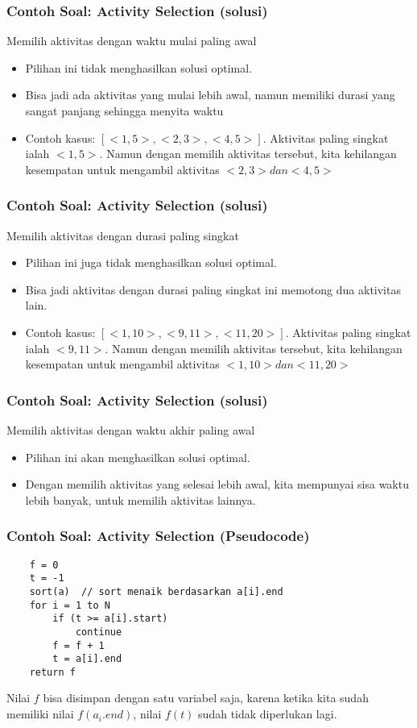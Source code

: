 \begin{frame}
	\frametitle{Contoh Soal: Activity Selection (solusi)}
	Memilih aktivitas dengan waktu mulai paling awal
	\begin{itemize}
		\item Pilihan ini tidak menghasilkan solusi optimal.
		\item Bisa jadi ada aktivitas  yang mulai lebih awal, namun memiliki durasi yang sangat panjang sehingga menyita waktu
		\item Contoh kasus: $[ <1,5>, <2, 3> , <4, 5> ]$. Aktivitas paling singkat ialah $<1, 5>$. Namun dengan memilih aktivitas tersebut, kita kehilangan kesempatan untuk mengambil aktivitas $<2, 3> dan <4, 5> $
	\end{itemize}
\end{frame}

\begin{frame}
	\frametitle{Contoh Soal: Activity Selection (solusi)}
	Memilih aktivitas dengan durasi paling singkat
	\begin{itemize}
		\item Pilihan ini juga tidak menghasilkan solusi optimal.
		\item Bisa jadi aktivitas dengan durasi paling singkat ini memotong dua aktivitas lain.
		\item Contoh kasus: $[ <1,10>, <9, 11> , <11, 20> ]$. Aktivitas paling singkat ialah $<9, 11>$. Namun dengan memilih aktivitas tersebut, kita kehilangan kesempatan untuk mengambil aktivitas $<1, 10> dan <11, 20> $
	\end{itemize}
\end{frame}

\begin{frame}
	\frametitle{Contoh Soal: Activity Selection (solusi)}
	Memilih aktivitas dengan waktu akhir paling awal
	\begin{itemize}
		\item Pilihan ini akan menghasilkan solusi optimal.
		\item Dengan memilih aktivitas yang selesai lebih awal, kita mempunyai sisa waktu lebih banyak, untuk memilih aktivitas lainnya.
	\end{itemize}
\end{frame}

\begin{frame} [fragile]
	\frametitle{Contoh Soal: Activity Selection (Pseudocode)}
	\begin{lstlisting}
	f = 0
	t = -1
	sort(a)  // sort menaik berdasarkan a[i].end
	for i = 1 to N
		if (t >= a[i].start)
			continue
		f = f + 1
		t = a[i].end
	return f
	\end{lstlisting}
	Nilai $f$ bisa disimpan dengan satu variabel saja, karena ketika kita sudah memiliki nilai $f(a_i.end)$, nilai $f(t)$ sudah tidak diperlukan lagi.
\end{frame}



